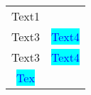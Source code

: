 \usepackage{multirow}
\usepackage{xcolor}
\begin{table}[]
\begin{tabular}{cc}
{Text1}\\
{Text3} & \textcolor[HTML]{0000ff}\colorbox[HTML]{00ffff}{Text4}}}\\
{Text3} & \textcolor[HTML]{0000ff}\colorbox[HTML]{00ffff}{Text4}}}\\
{\textcolor[HTML]{0000ff}\colorbox[HTML]{00ffff}{Tex}}}t3}\\
\end{tabular}
\end{table}
